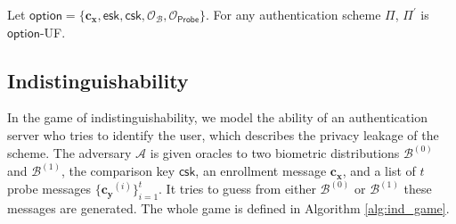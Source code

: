 \begin{theorem}
\label{thm:sEUF-CMA-esk-csk}
	Let $\textsf{option} = \{ \mathbf{c_x}, \textsf{esk}, \textsf{csk}, \mathcal{O}_\mathcal{B}, \mathcal{O}_{\textsf{Probe}} \}$. For any authentication scheme $\Pi$, $\Pi^\prime$ is $\textsf{option}$-UF. 
\end{theorem}



\subsection{Indistinguishability}
\label{sec:ind_game}


In the game of indistinguishability, we model the ability of an authentication server who tries to identify the user, which describes the privacy leakage of the scheme. The adversary $\mathcal{A}$ is given oracles to two biometric distributions $\mathcal{B}^{(0)}$ and $ \mathcal{B}^{(1)}$, the comparison key $\textsf{csk}$, an enrollment message $\mathbf{c_x}$, and a list of $t$ probe messages $\{ \mathbf{c_y}^{(i)} \}_{i=1}^t$. It tries to guess from either $\mathcal{B}^{(0)}$ or $ \mathcal{B}^{(1)}$ these messages are generated. The whole game is defined in Algorithm \ref{alg:ind_game}.

